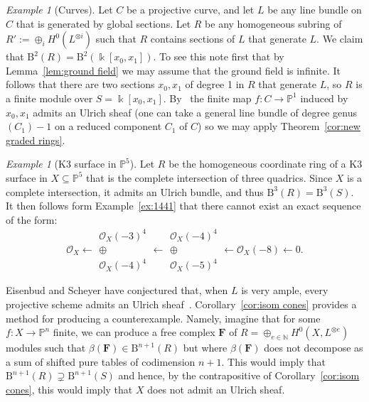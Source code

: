 \documentclass[12pt]{amsart}
\theoremstyle{definition}
\theoremstyle{remark}
\newtheorem{example}[lemma]{Example}
\newtheorem{remark}[lemma]{Remark}
\newcommand{\kk}{\Bbbk}
\newcommand{\PP}{\mathbb{P}}
\newcommand{\NN}{\mathbb{N}}
\newcommand{\cO}{\mathcal{O}}
\newcommand{\FF}{\mathbf{F}}
\newcommand{\BBQ}{\mathrm{B}}
\begin{document}
\begin{example}[Curves] Let $C$ be a projective curve, and let $L$ be any line bundle on $C$ that is generated by global sections.
Let $R$ be any homogeneous subring of $R' := \oplus_{i}H^{0}(L^{\otimes i})$ such that $R$ 
contains sections of $L$ that generate $L$. We claim that $\BBQ^2(R)=\BBQ^2(\kk[x_0,x_1])$. To see this note first
that by Lemma~\ref{lem:ground field} we may assume that the ground field is infinite. It follows that there are
two sections $x_{0},x_{1}$ of degree 1 in $R$ that generate $L$, so $R$ is a finite module over $S = \kk[x_{0},x_{1}].$
By~\cite[Corollary~4.5]{eis-schrey-chow} the finite map $f: C\to \PP^{1}$ induced by $x_{0}, x_{1}$ admits
an Ulrich sheaf (one can take a general line bundle of degree genus$(C_{1})-1$ on a reduced component $C_{1}$ of $C$)
so we may apply Theorem~\ref{cor:new graded rings}.
\end{example}


\begin{example}[K3 surface in $\PP^5$]
Let $R$ be the homogeneous coordinate ring of a K3 surface in $X\subseteq \PP^5$ that is the complete intersection of three quadrics. 
Since $X$ is a complete intersection, it admits an Ulrich bundle, and thus $\BBQ^3(R)=\BBQ^3(S)$.  It then follows form Example~\ref{ex:1441} that there cannot exist an exact sequence of the form:
\[
\cO_X\longleftarrow \begin{matrix}  \cO_X(-3)^4\\ \oplus\\ \cO_X(-4)^4\end{matrix}\longleftarrow \begin{matrix} \cO_X(-4)^4\\ \oplus\\ \cO_X(-5)^4\end{matrix} \longleftarrow \cO_X(-8)\longleftarrow 0.
\]
\end{example}



Eisenbud and Scheyer have conjectured that, when $L$ is very ample, every projective scheme admits an Ulrich sheaf~\cite[p. 543]{eis-schrey-chow}.  Corollary~\ref{cor:isom cones} provides a method for producing a counterexample.  Namely, imagine that for some $f\colon X\to \PP^n$ finite, we can produce a free complex $\FF$ of $R=\oplus_{e\in \NN} H^0(X,L^{\otimes e})$ modules such that $\beta(\FF)\in \BBQ^{n+1}(R)$ but where $\beta(\FF)$ does not decompose as a sum of shifted pure tables of codimension $n+1$.  This would imply that $\BBQ^{n+1}(R)\supsetneq \BBQ^{n+1}(S)$ and hence, by the contrapositive of Corollary~\ref{cor:isom cones}, this would imply that $X$ does not admit an Ulrich sheaf.
\end{document}
